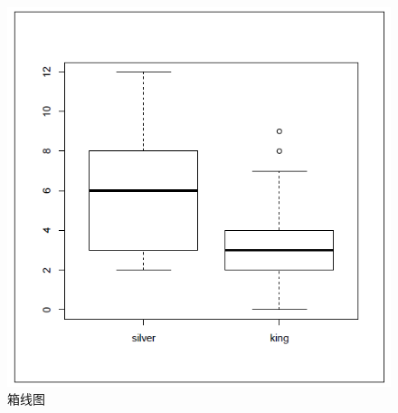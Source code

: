 		\begin{figure}
		\begin{center}
		\caption{箱线图}
		\includegraphics[scale=0.3]{boplot.PNG}
	\end{center}
\end{figure} 
